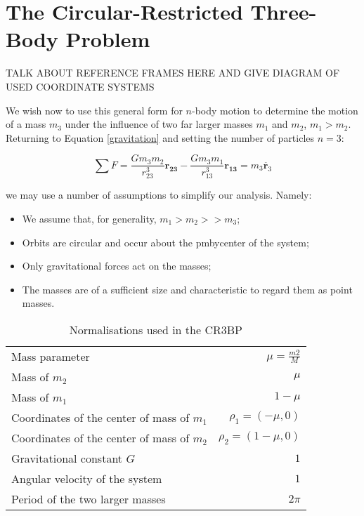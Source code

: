 \section{The Circular-Restricted Three-Body Problem}

TALK ABOUT REFERENCE FRAMES HERE AND GIVE DIAGRAM OF USED COORDINATE SYSTEMS


We wish now to use this general form for $n$-body motion to determine the motion of a mass $m_3$ under the influence of two far larger masses $m_1$ and $m_2$, $m_1 > m_2$. Returning to Equation \ref{gravitation} and setting the number of particles $n=3$:

\begin{equation}\label{eq:newtonian3}
\sum F = \frac{Gm_3m_2}{r^3_{23}}\pmb{r_{23}} - \frac{Gm_3m_1}{r^3_{13}} \pmb{r_{13}} = m_3 \ddot{\pmb{r}_3}
\end{equation}

\noindent we may use a number of assumptions to simplify our analysis. Namely:

\begin{itemize}
\item We assume that, for generality, $m_1 > m_2 >> m_3$;
\item Orbits are circular and occur about the pmbycenter of the system;
\item Only gravitational forces act on the masses;
\item The masses are of a sufficient size and characteristic to regard them as point masses.
\end{itemize}


\begin{table}
\centering
\begin{tabular}{l r}
\toprule
\toprule
Mass parameter & $\mu = \frac{m2}{M}$ \\
Mass of $m_2$ & $\mu$\\
Mass of $m_1$ & $1 - \mu$\\
Coordinates of the center of mass of $m_1$ & $\rho_1 = (-\mu, 0)$\\
Coordinates of the center of mass of $m_2$ & $\rho_2 = (1-\mu, 0)$\\
Gravitational constant $G$ &  $1$\\
Angular velocity of the system & $1$\\
Period of the two larger masses & $2\pi$\\
\bottomrule
\bottomrule
\end{tabular}
\caption{Normalisations used in the CR3BP}
\label{tbl:normalisations}
\end{table}

